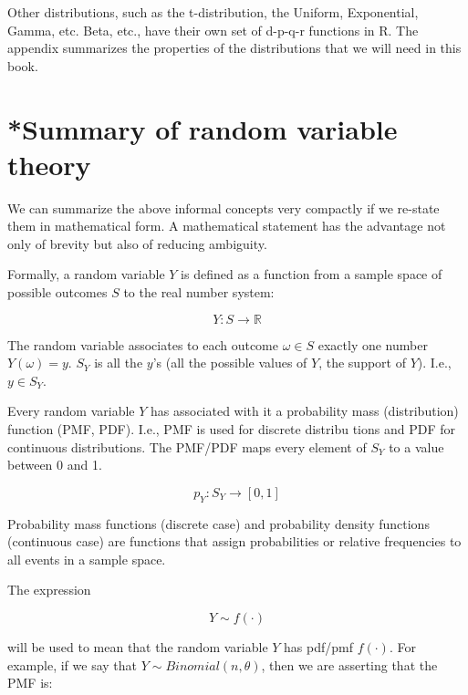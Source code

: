 \documentclass[12pt,]{krantz}
\begin{document}
Other distributions, such as the t-distribution, the Uniform, Exponential, Gamma, etc. Beta, etc., have their own set of d-p-q-r functions in R. The appendix summarizes the properties of the distributions that we will need in this book.

\hypertarget{summary-of-random-variable-theory}{%
\section{*Summary of random variable theory}\label{summary-of-random-variable-theory}}

We can summarize the above informal concepts very compactly if we re-state them in mathematical form. A mathematical statement has the advantage not only of brevity but also of reducing ambiguity.

Formally, a random variable \(Y\) is defined as a function from a sample space of possible outcomes \(S\) to the real number system:

\begin{equation}
Y : S \rightarrow \mathbb{R}
\end{equation}

The random variable associates to each outcome \(\omega \in S\) exactly one number \(Y(\omega) = y\). \(S_Y\) is all the \(y\)'s (all the possible values of \(Y\), the support of \(Y\)). I.e., \(y \in S_Y\).

Every random variable \(Y\) has associated with it a probability mass (distribution) function (PMF, PDF). I.e., PMF is used for discrete distribu tions and PDF for continuous distributions. The PMF/PDF maps every element of \(S_Y\) to a value between 0 and 1.

\begin{equation}
p_Y : S_Y \rightarrow [0, 1] 
\end{equation}

Probability mass functions (discrete case) and probability density functions (continuous case) are functions that assign probabilities or relative frequencies to all events in a sample space.

The expression

\begin{equation}
 Y \sim f(\cdot)
\end{equation}

\noindent
will be used to mean that the random variable \(Y\) has pdf/pmf \(f(\cdot)\).
For example, if we say that \(Y \sim Binomial(n,\theta)\), then we are asserting that the PMF is:
\end{document}
